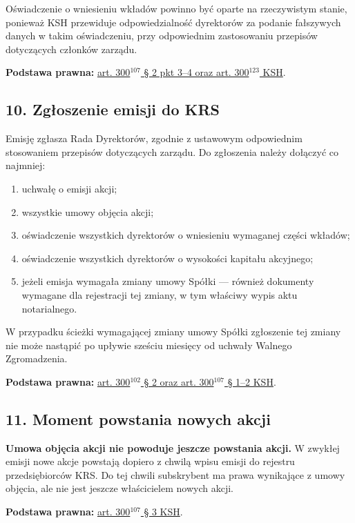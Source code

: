 \documentclass[12pt,a4paper]{report}
\begin{document}
Oświadczenie o wniesieniu wkładów powinno być oparte na rzeczywistym stanie, ponieważ KSH przewiduje odpowiedzialność dyrektorów za podanie fałszywych danych w takim oświadczeniu, przy odpowiednim zastosowaniu przepisów dotyczących członków zarządu.

\textbf{Podstawa prawna:} \href{https://eli.gov.pl/api/acts/DU/2024/18/text.html}{art. 300$^{107}$ § 2 pkt 3--4 oraz art. 300$^{123}$ KSH}.

\subsection*{10. Zgłoszenie emisji do KRS}

Emisję zgłasza Rada Dyrektorów, zgodnie z ustawowym odpowiednim stosowaniem przepisów dotyczących zarządu. Do zgłoszenia należy dołączyć co najmniej:
\begin{enumerate}
  \item uchwałę o emisji akcji;
  \item wszystkie umowy objęcia akcji;
  \item oświadczenie wszystkich dyrektorów o wniesieniu wymaganej części wkładów;
  \item oświadczenie wszystkich dyrektorów o wysokości kapitału akcyjnego;
  \item jeżeli emisja wymagała zmiany umowy Spółki --- również dokumenty wymagane dla rejestracji tej zmiany, w tym właściwy wypis aktu notarialnego.
\end{enumerate}

W przypadku ścieżki wymagającej zmiany umowy Spółki zgłoszenie tej zmiany nie może nastąpić po upływie sześciu miesięcy od uchwały Walnego Zgromadzenia.

\textbf{Podstawa prawna:} \href{https://eli.gov.pl/api/acts/DU/2024/18/text.html}{art. 300$^{102}$ § 2 oraz art. 300$^{107}$ § 1--2 KSH}.

\subsection*{11. Moment powstania nowych akcji}

\textbf{Umowa objęcia akcji nie powoduje jeszcze powstania akcji.} W zwykłej emisji nowe akcje powstają dopiero z chwilą wpisu emisji do rejestru przedsiębiorców KRS. Do tej chwili subskrybent ma prawa wynikające z umowy objęcia, ale nie jest jeszcze właścicielem nowych akcji.

\textbf{Podstawa prawna:} \href{https://eli.gov.pl/api/acts/DU/2024/18/text.html}{art. 300$^{107}$ § 3 KSH}.
\end{document}
